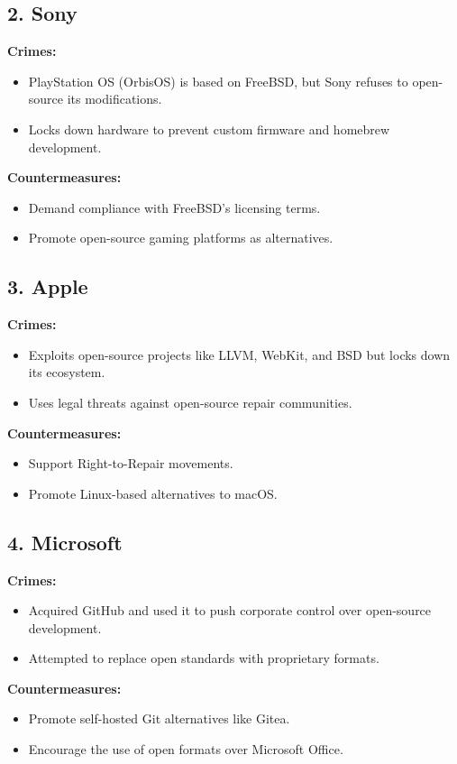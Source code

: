 \documentclass[12pt]{article}
\begin{document}
\subsection{2. Sony}
\textbf{Crimes:}
\begin{itemize}
    \item PlayStation OS (OrbisOS) is based on FreeBSD, but Sony refuses to open-source its modifications.
    \item Locks down hardware to prevent custom firmware and homebrew development.
\end{itemize}

\textbf{Countermeasures:}
\begin{itemize}
    \item Demand compliance with FreeBSD’s licensing terms.
    \item Promote open-source gaming platforms as alternatives.
\end{itemize}

\subsection{3. Apple}
\textbf{Crimes:}
\begin{itemize}
    \item Exploits open-source projects like LLVM, WebKit, and BSD but locks down its ecosystem.
    \item Uses legal threats against open-source repair communities.
\end{itemize}

\textbf{Countermeasures:}
\begin{itemize}
    \item Support Right-to-Repair movements.
    \item Promote Linux-based alternatives to macOS.
\end{itemize}

\subsection{4. Microsoft}
\textbf{Crimes:}
\begin{itemize}
    \item Acquired GitHub and used it to push corporate control over open-source development.
    \item Attempted to replace open standards with proprietary formats.
\end{itemize}

\textbf{Countermeasures:}
\begin{itemize}
    \item Promote self-hosted Git alternatives like Gitea.
    \item Encourage the use of open formats over Microsoft Office.
\end{itemize}
\end{document}
